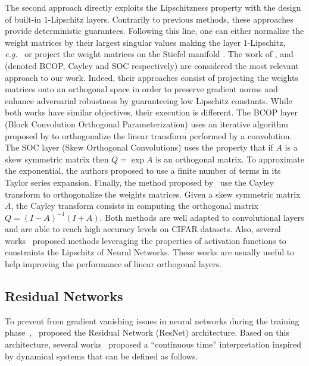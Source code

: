 The second approach directly exploits the Lipschitzness property with the design of built-in $1$-Lipschitz layers. Contrarily to previous methods,  these approaches provide deterministic guarantees.
Following this line, one can either normalize the weight matrices by their largest singular values making the layer $1$-Lipschitz, \emph{e.g.}~\citep{yoshida2017spectral,miyato2018spectral,farnia2018generalizable,anil2019sorting} or project the weight matrices on the Stiefel manifold \citep{li2019preventing,trockman2021orthogonalizing,skew2021sahil}.
The work of \citet{li2019preventing}, \citet{trockman2021orthogonalizing} and \citet{skew2021sahil} (denoted BCOP, Cayley and SOC respectively) are considered the most relevant approach to our work.
Indeed, their approaches consist of projecting the weights matrices onto an orthogonal space in order to preserve gradient norms and enhance adversarial robustness by guaranteeing low Lipschitz constants. 
While both works have similar objectives, their execution is different.
The BCOP layer (Block Convolution Orthogonal Parameterization) uses an iterative algorithm proposed by \citet{bjorck1971iterative} to orthogonalize the linear transform performed by a convolution.
The SOC layer (Skew Orthogonal Convolutions) uses the property that if $A$ is a skew symmetric matrix then $Q=\exp{A}$ is an orthogonal matrix. To approximate the exponential, the authors proposed to use a finite number of terms in its Taylor series expansion.
Finally, the method proposed by~\citet{trockman2021orthogonalizing} use the Cayley transform to orthogonalize the weights matrices.
Given a skew symmetric matrix $A$, the Cayley transform consists in computing the orthogonal matrix $Q = (I - A)^{-1} (I + A)$. Both methods are well adapted to convolutional layers and are able to reach high accuracy levels on CIFAR datasets. Also, several works~\cite{anil2019sorting,singla2021householder,huang2021local} proposed methods leveraging the properties of activation functions to constraints the Lipschitz of Neural Networks. These works are usually useful to help  improving the performance of linear orthogonal layers.


\subsection{Residual Networks}

To prevent from gradient vanishing issues in neural networks during the training phase~\citep{hochreiter2001gradient},~\cite{he2016deep} proposed the Residual Network (ResNet) architecture.
Based on this architecture, several works~\citep{haber2017stable,e17Proposal,lu18beyond,chen2018neural} proposed a ``continuous time'' interpretation inspired by dynamical systems that can be defined as follows.

